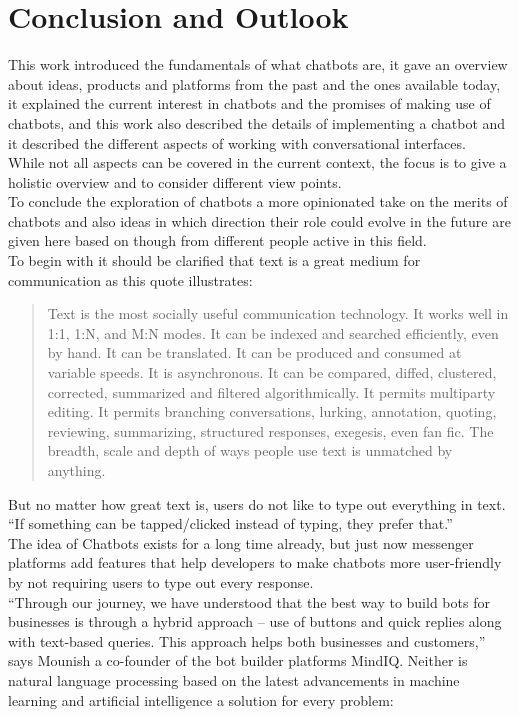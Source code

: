\chapter{Conclusion and Outlook}


This work introduced the fundamentals of what chatbots are,
it gave an overview about ideas, products and platforms from the past and the ones available today,
it explained the current interest in chatbots and the promises of making use of chatbots,
and this work also described the details of implementing a chatbot and it described the different aspects of working with conversational interfaces.
\\

While not all aspects can be covered in the current context,
the focus is to give a holistic overview and to consider different view points.
\\

To conclude the exploration of chatbots a more opinionated take on the merits of chatbots
and also ideas in which direction their role could evolve in the future are given here
based on though from different people active in this field.
\\

To begin with it should be clarified that text is a great medium for communication as this quote\cite{futuretext} illustrates:

\begin{quote}
Text is the most socially useful communication technology. It works well in 1:1, 1:N, and M:N modes. It can be indexed and searched efficiently, even by hand. It can be translated. It can be produced and consumed at variable speeds. It is asynchronous. It can be compared, diffed, clustered, corrected, summarized and filtered algorithmically. It permits multiparty editing. It permits branching conversations, lurking, annotation, quoting, reviewing, summarizing, structured responses, exegesis, even fan fic. The breadth, scale and depth of ways people use text is unmatched by anything.
\end{quote}

But no matter how great text is, users do not like to type out everything in text.
``If something can be tapped/clicked instead of typing, they prefer that.''\cite{chatbotslife}
\\
The idea of Chatbots exists for a long time already,
but just now messenger platforms add features that help developers to make chatbots more user-friendly by not requiring users to type out every response.
\\
``Through our journey, we have understood that the best way to build bots for businesses is through a hybrid approach – use of buttons and quick replies along with text-based queries. This approach helps both businesses and customers,'' says Mounish a co-founder of the bot builder platforms MindIQ\cite{techinasia}.
Neither is natural language processing based on the latest advancements in machine learning and artificial intelligence a solution for every problem\cite{neednlp}:

